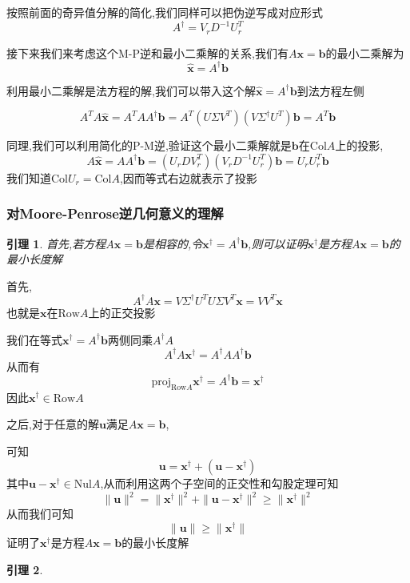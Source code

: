 \documentclass{article}
\newtheorem{lemma}{引理}[subsection]
\newenvironment{cproof}{%
\heiti{证明}\kaishu
}{%
}
\newcommand{\ve}{\boldsymbol}
\newcommand{\col}{\text{Col}}
\newcommand{\row}{\text{Row}}
\newcommand{\nul}{\text{Nul}}
\newcommand{\proj}{\text{proj}}
\begin{document}
\begin{CJK}{UTF8}{gkai}
按照前面的奇异值分解的简化,我们同样可以把伪逆写成对应形式
\[A^\dagger = V_r D^{-1} U_r^T\]

接下来我们来考虑这个M-P逆和最小二乘解的关系,我们有$A\ve{x} = \ve{b}$的最小二乘解为
\[\hat{\ve{x}} = A^\dagger \ve{b}\]

\begin{cproof}
利用最小二乘解是法方程的解,我们可以带入这个解$\hat{\ve{x}} = A^\dagger \ve{b}$到法方程左侧

\[A^T A \hat{\ve{x}} = A^T A A^\dagger \ve{b} = A^T (U \Sigma V^T )(V \Sigma^\dagger U^T) \ve{b} = A^T \ve{b}\]
\end{cproof}

同理,我们可以利用简化的P-M逆,验证这个最小二乘解就是$\ve{b}$在$\col A$上的投影,
\[A \hat{\ve{x}} = A  A^\dagger \ve{b} = (U_r D V_r^T )(V_r D^{-1} U_r^T) \ve{b} = U_r U_r^T \ve{b}\]
我们知道$\col U_r = \col A$,因而等式右边就表示了投影
\subsubsection{对Moore-Penrose逆几何意义的理解}
\begin{lemma}
    
    首先,若方程$A\ve{x} = \ve{b}$是相容的,令$\ve{x}^\dagger = A^\dagger \ve{b}$,则可以证明$\ve{x}^\dagger$是方程$A\ve{x} = \ve{b}$的最小长度解
    
\end{lemma}
\begin{cproof}
首先,
\[A^\dagger A \ve{x} = V \Sigma^\dagger U^T U \Sigma V^T \ve{x} = V V^T \ve{x}\]
也就是$\ve{x}$在$\row A$上的正交投影

我们在等式$\ve{x}^\dagger = A^\dagger \ve{b}$两侧同乘$A^\dagger A$
\[A^\dagger A \ve{x}^\dagger = A^\dagger A A^\dagger \ve{b}\]
从而有
\[\proj_{\row A} \ve{x}^\dagger = A^\dagger \ve{b} = \ve{x}^\dagger\]
因此$\ve{x}^\dagger \in \row A$

之后,对于任意的解$\ve{u}$满足$A\ve{x} = \ve{b}$,

可知
\[\ve{u} = \ve{x}^\dagger + (\ve{u} - \ve{x}^\dagger)\]
其中$\ve{u} - \ve{x}^\dagger \in \nul A$,从而利用这两个子空间的正交性和勾股定理可知
\[\|\ve{u}\|^2 =\|\ve{x}^\dagger\|^2 + \|\ve{u} - \ve{x}^\dagger\|^2 \geq \|\ve{x}^\dagger\|^2 \]
从而我们可知
\[\|\ve{u}\| \geq \|\ve{x}^\dagger\|\]
证明了$\ve{x}^\dagger$是方程$A\ve{x} = \ve{b}$的最小长度解\\
\end{cproof}
\begin{lemma}
    

\end{lemma}
\end{CJK}
\end{document}
